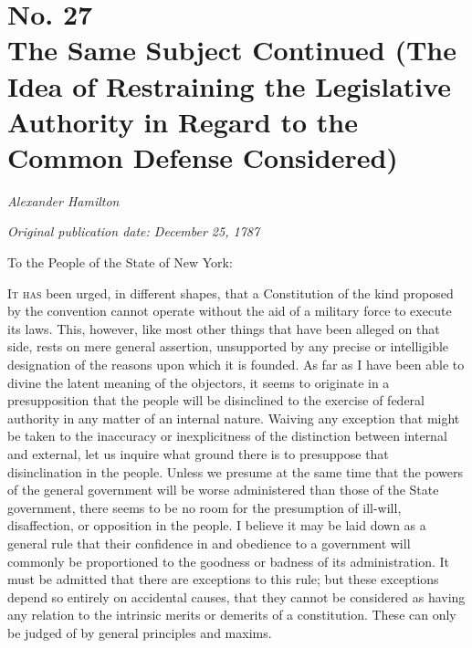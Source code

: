 \chapter[No. 27: The Same Subject Continued (The Idea of Restraining the Legislative Authority in Regard to the Common Defense Considered)]{No. 27\\ {\small The Same Subject Continued (The Idea of Restraining the Legislative Authority in Regard to the Common Defense Considered)}}

\textit{Alexander Hamilton}

\textit{Original publication date: December 25, 1787}
\vspace{1cm}

To the People of the State of New York:
\vspace{.4cm}

\textsc{It has} been urged, in different shapes, that a Constitution of the kind proposed by the convention cannot operate without the aid of a military force to execute its laws. 
This, however, like most other things that have been alleged on that side, rests on mere general assertion, unsupported by any precise or intelligible designation of the reasons upon which it is founded. 
As far as I have been able to divine the latent meaning of the objectors, it seems to originate in a presupposition that the people will be disinclined to the exercise of federal authority in any matter of an internal nature. 
Waiving any exception that might be taken to the inaccuracy or inexplicitness of the distinction between internal and external, let us inquire what ground there is to presuppose that disinclination in the people. 
Unless we presume at the same time that the powers of the general government will be worse administered than those of the State government, there seems to be no room for the presumption of ill-will, disaffection, or opposition in the people. 
I believe it may be laid down as a general rule that their confidence in and obedience to a government will commonly be proportioned to the goodness or badness of its administration. 
It must be admitted that there are exceptions to this rule; but these exceptions depend so entirely on accidental causes, that they cannot be considered as having any relation to the intrinsic merits or demerits of a constitution. 
These can only be judged of by general principles and maxims.


